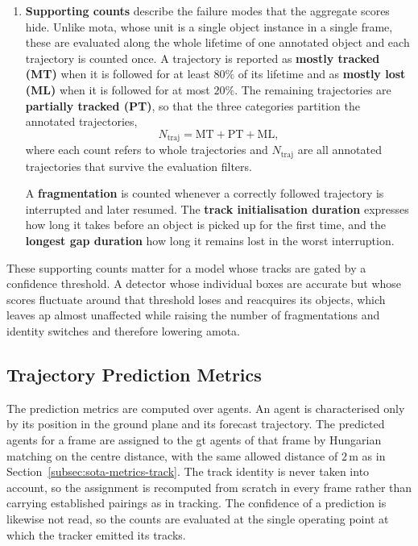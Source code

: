 \begin{enumerate}
    \item \textbf{Supporting counts} describe the failure modes that the aggregate scores hide. Unlike
    \acs{mota}, whose unit is a single object instance in a single frame, these are evaluated along the
    whole lifetime of one annotated object and each trajectory is counted once. 
    A trajectory is reported as \textbf{mostly tracked (MT)} when it is followed for at least \(80\%\) of its
    lifetime and as \textbf{mostly lost (ML)} when it is followed for at most \(20\%\). The remaining
    trajectories are \textbf{partially tracked (PT)}, so that the three categories partition the annotated
    trajectories,
    \begin{equation}
        N_{\mathrm{traj}} = \mathrm{MT} + \mathrm{PT} + \mathrm{ML},
        \label{eq:traj-partition}
    \end{equation}
    where each count refers to whole trajectories and \(N_{\mathrm{traj}}\) are all annotated trajectories that survive the evaluation filters.

     A \textbf{fragmentation} is counted 
    whenever a correctly followed trajectory is interrupted and later resumed. The
    \textbf{track initialisation duration} expresses how long it takes before an object is picked up for
    the first time, and the \textbf{longest gap duration} how long it remains lost in the worst
    interruption.
\end{enumerate}

These supporting counts matter for a model whose tracks are gated by a confidence threshold. A detector
whose individual boxes are accurate but whose scores fluctuate around that threshold loses and reacquires
its objects, which leaves \acs{ap} almost unaffected while raising the number of fragmentations and
identity switches and therefore lowering \acs{amota}.


\subsection{Trajectory Prediction Metrics}
\label{subsec:sota-metrics-pred}
The prediction metrics are computed over agents. An agent is characterised only by its position in the
ground plane and its forecast trajectory. The predicted agents for a frame are assigned to the \ac{gt}
agents of that frame by Hungarian matching on the centre distance, with the same allowed distance of
\(2\,\mathrm{m}\) as in Section~\ref{subsec:sota-metrics-track}.
The track identity is never taken into account, so the assignment is recomputed from scratch in
every frame rather than carrying established pairings as in tracking. The confidence of a prediction is likewise not read, so the counts are
evaluated at the single operating point at which the tracker emitted its tracks.

